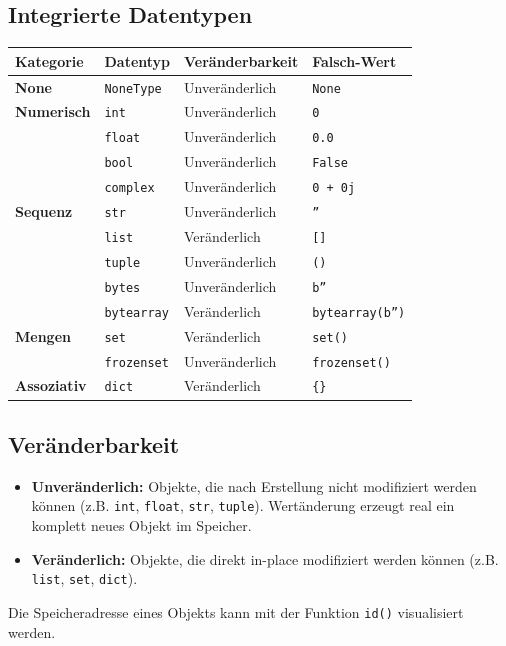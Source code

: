 \subsection{Integrierte Datentypen}
\begin{center}
    \begin{tabular}{llll}
        \toprule
        \textbf{Kategorie} & \textbf{Datentyp} & \textbf{Veränderbarkeit} & \textbf{Falsch-Wert} \\ \midrule
        \textbf{None} & \texttt{NoneType} & Unveränderlich & \texttt{None} \\ \addlinespace
        \textbf{Numerisch} & \texttt{int} & Unveränderlich & \texttt{0} \\
        & \texttt{float} & Unveränderlich & \texttt{0.0} \\
        & \texttt{bool} & Unveränderlich & \texttt{False} \\
        & \texttt{complex} & Unveränderlich & \texttt{0 + 0j} \\ \addlinespace
        \textbf{Sequenz} & \texttt{str} & Unveränderlich & \texttt{''} \\
        & \texttt{list} & Veränderlich & \texttt{[]} \\
        & \texttt{tuple} & Unveränderlich & \texttt{()} \\
        & \texttt{bytes} & Unveränderlich & \texttt{b''} \\
        & \texttt{bytearray} & Veränderlich & \texttt{bytearray(b'')} \\ \addlinespace
        \textbf{Mengen} & \texttt{set} & Veränderlich & \texttt{set()} \\
        & \texttt{frozenset} & Unveränderlich & \texttt{frozenset()} \\ \addlinespace
        \textbf{Assoziativ} & \texttt{dict} & Veränderlich & \texttt{\{\}} \\ \bottomrule
    \end{tabular}
\end{center}

\subsection{Veränderbarkeit}
\begin{itemize}
    \item \textbf{Unveränderlich:} Objekte, die nach Erstellung nicht modifiziert werden können (z.B. \texttt{int}, \texttt{float}, \texttt{str}, \texttt{tuple}). Wertänderung erzeugt real ein komplett neues Objekt im Speicher.
    \item \textbf{Veränderlich:} Objekte, die direkt in-place modifiziert werden können (z.B. \texttt{list}, \texttt{set}, \texttt{dict}).
\end{itemize}\vspace{1em}
Die Speicheradresse eines Objekts kann mit der Funktion \texttt{id()} visualisiert werden. 

